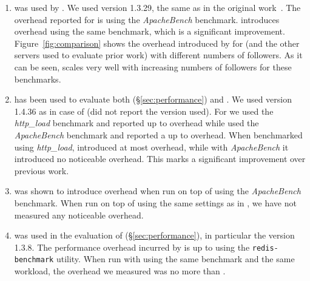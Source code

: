 \begin{enumerate}

\item[\httpd\footnote{\url{https://httpd.apache.org/}}]
was used by \orchestra.  We used version 1.3.29, the same as in the
original work~\cite{orchestra09}.  The overhead reported for
\orchestra is \orchestraHttpd using the \emph{ApacheBench}
benchmark. \varan introduces \httpdAbOneFollower overhead using the
same benchmark, which is a significant improvement.
Figure~\ref{fig:comparison} shows the overhead introduced by \varan
for \httpd (and the other servers used to evaluate prior work) with
different numbers of followers.  As it can be seen, \varan scales very
well with increasing numbers of followers for these benchmarks.


\item[\lighttpd\footnote{\url{http://www.lighttpd.net/}}]
has been used to evaluate both \mx (\S\ref{sec:performance}) and \tachyon.  We
used version 1.4.36 as in case of \mx (\tachyon did not report the version
used).  For \mx we used the \emph{http\_load} benchmark and reported up to
\mxLighttpd overhead while \tachyon used the \emph{ApacheBench} benchmark and
reported a up to \tachyonLighttpd overhead.  When benchmarked using
\emph{http\_load}, \varan introduced at most \lighttpdHttploadOneFollower
overhead, while with \emph{ApacheBench} it introduced no noticeable overhead.
This marks a significant improvement over previous work.

\item[\thttpd\footnote{\url{http://www.acme.com/software/thttpd/}}]
was shown to introduce \tachyonThttpd overhead when run on top of
\tachyon using the \emph{ApacheBench} benchmark. When run on top of
\varan using the same settings as in \cite{tachyon12}, we have not
measured any noticeable overhead.

\item[\redis\footnote{\url{http://redis.io/}}]
was used in the evaluation of \mx (\S\ref{sec:performance}), in particular the
version 1.3.8. The performance overhead incurred by \mx is up to \mxRedis
using the \lstinline`redis-benchmark` utility. When run with \varan using the
same benchmark and the same workload, the overhead we measured was no more than
\redisOneFollower.


\end{enumerate}

